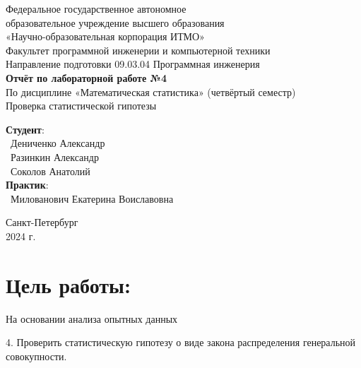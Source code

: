 \documentclass{article}
\begin{document}
\begin{center}
    \Large
    Федеральное государственное автономное \\
    образовательное учреждение высшего образования \\ 
    «Научно-образовательная корпорация ИТМО»\\
    \vspace{0.5cm}
    \large
    Факультет программной инженерии и компьютерной техники \\
    Направление подготовки 09.03.04 Программная инженерия \\
    \vspace{1cm}
    \Large
    \textbf{Отчёт по лабораторной работе №4} \\
    По дисциплине «Математическая статистика» (четвёртый семестр)\\
    Проверка статистической гипотезы\\
    \large
    \vspace{8cm}

    \begin{minipage}{.33\textwidth}
    \end{minipage}
    \hfill
    \begin{minipage}{.4\textwidth}
    
        \textbf{Студент}: \vspace{.1cm} \\
        \ Дениченко Александр\\
        \ Разинкин Александр\\
        \ Соколов Анатолий\\
        \textbf{Практик}:  \\
        \ Милованович Екатерина Воиславовна
    \end{minipage}
    \vfill
Санкт-Петербург\\ 2024 г.
\end{center}

\newpage
\section*{Цель работы:}
\large

На основании анализа опытных данных

4. Проверить статистическую гипотезу о виде закона распределения генеральной совокупности.
\end{document}
